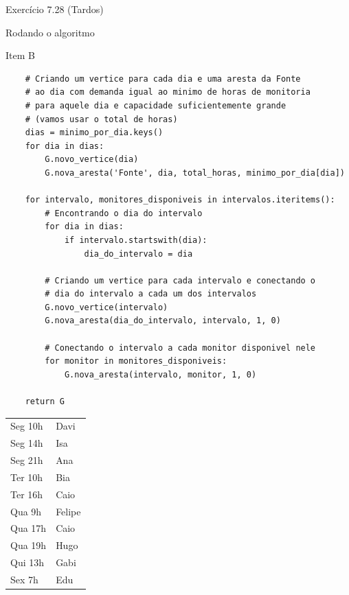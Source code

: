 \documentclass[presentation]{beamer}
\begin{document}
\begin{frame}[fragile,label=sec-2]{Exercício 7.28 (Tardos)}
\begin{block}{Rodando o algoritmo}
\begin{block}{Item B}
\begin{verbatim}
    # Criando um vertice para cada dia e uma aresta da Fonte
    # ao dia com demanda igual ao minimo de horas de monitoria
    # para aquele dia e capacidade suficientemente grande
    # (vamos usar o total de horas)
    dias = minimo_por_dia.keys()
    for dia in dias:
        G.novo_vertice(dia)
        G.nova_aresta('Fonte', dia, total_horas, minimo_por_dia[dia])

    for intervalo, monitores_disponiveis in intervalos.iteritems():
        # Encontrando o dia do intervalo
        for dia in dias:
            if intervalo.startswith(dia):
                dia_do_intervalo = dia

        # Criando um vertice para cada intervalo e conectando o
        # dia do intervalo a cada um dos intervalos
        G.novo_vertice(intervalo)
        G.nova_aresta(dia_do_intervalo, intervalo, 1, 0)

        # Conectando o intervalo a cada monitor disponivel nele
        for monitor in monitores_disponiveis:
            G.nova_aresta(intervalo, monitor, 1, 0)

    return G
\end{verbatim}

\begin{center}
\begin{tabular}{ll}
Seg 10h & Davi\\
Seg 14h & Isa\\
Seg 21h & Ana\\
Ter 10h & Bia\\
Ter 16h & Caio\\
Qua 9h & Felipe\\
Qua 17h & Caio\\
Qua 19h & Hugo\\
Qui 13h & Gabi\\
Sex 7h & Edu\\
\end{tabular}
\end{center}
\end{block}
\end{block}
\end{frame}
\end{document}
